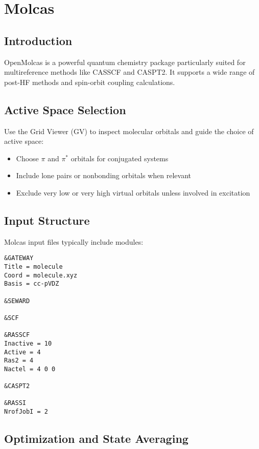 
\chapter{Molcas}

\section{Introduction}

OpenMolcas is a powerful quantum chemistry package particularly suited for multireference methods like CASSCF and CASPT2. It supports a wide range of post-HF methods and spin-orbit coupling calculations.

\section{Active Space Selection}

Use the Grid Viewer (GV) to inspect molecular orbitals and guide the choice of active space:

\begin{itemize}
  \item Choose $\pi$ and $\pi^*$ orbitals for conjugated systems
  \item Include lone pairs or nonbonding orbitals when relevant
  \item Exclude very low or very high virtual orbitals unless involved in excitation
\end{itemize}

\section{Input Structure}

Molcas input files typically include modules:

\begin{verbatim}
&GATEWAY
Title = molecule
Coord = molecule.xyz
Basis = cc-pVDZ

&SEWARD

&SCF

&RASSCF
Inactive = 10
Active = 4
Ras2 = 4
Nactel = 4 0 0

&CASPT2

&RASSI
NrofJobI = 2
\end{verbatim}

\section{Optimization and State Averaging}

